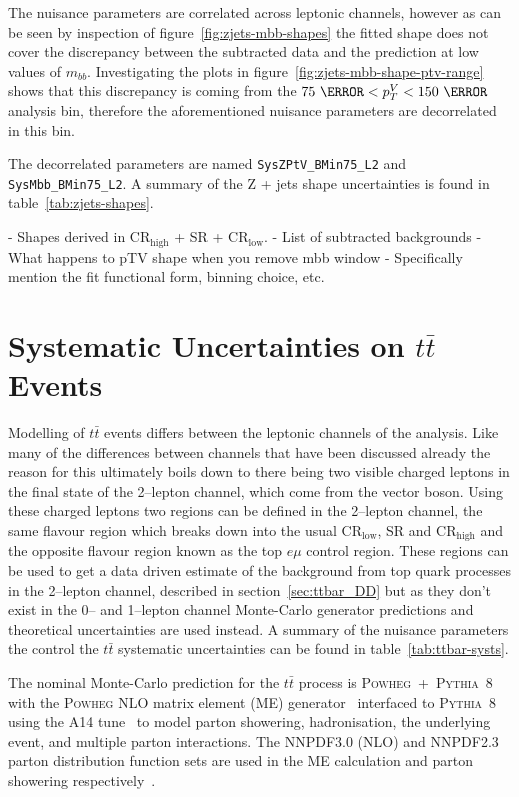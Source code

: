 The nuisance parameters are correlated across leptonic channels, however as can
be seen by inspection of figure~\ref{fig:zjets-mbb-shapes} the fitted shape does
not cover the discrepancy between the subtracted data and the prediction at low
values of $m_{bb}$. Investigating the plots in
figure~\ref{fig:zjets-mbb-shape-ptv-range} shows that this discrepancy is coming
from the $75~\GeV < p_T^V < 150~\GeV$ analysis bin, therefore the aforementioned
nuisance parameters are decorrelated in this bin.

The decorrelated parameters are named \texttt{SysZPtV\_BMin75\_L2} and
\texttt{SysMbb\_BMin75\_L2}. A summary of the Z + jets shape uncertainties is
found in table~\ref{tab:zjets-shapes}.


- Shapes derived in CR$_{\text{high}}$ + SR + CR$_{\text{low}}$.
- List of subtracted backgrounds
- What happens to pTV shape when you remove mbb window
- Specifically mention the fit functional form, binning choice, etc. 

\section{Systematic Uncertainties on \texorpdfstring{$t\bar{t}$}{tt} Events}

Modelling of $t\bar{t}$ events differs between the leptonic channels of the
analysis. Like many of the differences between channels that have been discussed
already the reason for this ultimately boils down to there being two visible
charged leptons in the final state of the 2--lepton channel, which come from the
vector boson. Using these charged leptons two regions can be defined in the
2--lepton channel, the same flavour region which breaks down into the usual
CR$_{\text{low}}$, SR and CR$_{\text{high}}$ and the opposite flavour region
known as the top $e\mu$ control region. These regions can be used to get a data
driven estimate of the background from top quark processes in the 2--lepton
channel, described in section~\ref{sec:ttbar_DD} but as they don't exist in the
0-- and 1--lepton channel Monte-Carlo generator predictions and theoretical
uncertainties are used instead. A summary of the nuisance parameters the control
the $t\bar{t}$ systematic uncertainties can be found in
table~\ref{tab:ttbar-systs}.


The nominal Monte-Carlo prediction for the $t\bar{t}$ process is
\textsc{Powheg}~+~\textsc{Pythia}~8 with the \textsc{Powheg} NLO matrix element
(ME) generator~\cite{JHEP0709.2007.126,JHEP0411.2004.040} interfaced to
\textsc{Pythia}~8~\cite{Comp.Phys.Comm.191.159} using the A14
tune~\cite{ATL-PHYS-PUB-2014-021} to model parton showering, hadronisation,
the underlying event, and multiple parton interactions. The NNPDF3.0 (NLO) and
NNPDF2.3 parton distribution function sets are used in the ME calculation and
parton showering respectively~\cite{ATL-PHYS-PUB-2016-020}.

